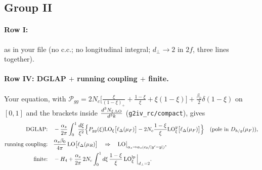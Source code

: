 \documentclass[10pt]{article}
\numberwithin{equation}{section}
\newcommand{\LO}{{\rm LO}}
\begin{document}
\subsection{Group II}
\paragraph{Row I:} as in your file (no c.c.; no longitudinal integral; $d_\perp\to2$ in $2f$, three lines together).
\paragraph{Row IV: DGLAP $+$ running coupling $+$ finite.} Your equation, with $\mathcal P_{gg}=2N_c\big[\frac{\xi}{(1-\xi)_+}+\frac{1-\xi}{\xi}+\xi(1-\xi)\big]+\frac{\beta_0}{2}\delta(1-\xi)$ on $[0,1]$ and the brackets inside $\frac{d^3N_{\xi,\rm LO}}{d^3k}$ (\texttt{g2iv\_rc/compact}), gives
\begin{align}
\text{DGLAP:}&\quad-\frac{\alpha_s}{2\pi}\int_0^1\frac{d\xi}{\xi^2}\Big\{P_{gg}(\xi)\LO_\xi\big[\ell_\Delta(\mu_F)\big]-2N_c\frac{1-\xi}{\xi}\LO^{y}_\xi\big[\ell_\Delta(\mu_F)\big]\Big\}\quad(\text{pole in }D_{h/g}(\mu_F)),\label{LT:eq:dglap}\\
\text{running coupling:}&\quad\frac{\alpha_s\beta_0}{4\pi}\,\LO\big[\ell_\Delta(\mu_R)\big]\quad\Rightarrow\quad\LO\big|_{\alpha_s\to\alpha_s(c_0/|y'-y|)},\label{LT:eq:rc}\\
\text{finite:}&\quad-H_4+\frac{\alpha_s}{2\pi}\,2N_c\int_0^1d\xi\,\frac{1-\xi}{\xi}\,\LO^{\rm lp}_\xi\,\Big|_{d_\perp=2}.\label{LT:eq:G2IVfin}
\end{align}
\end{document}
